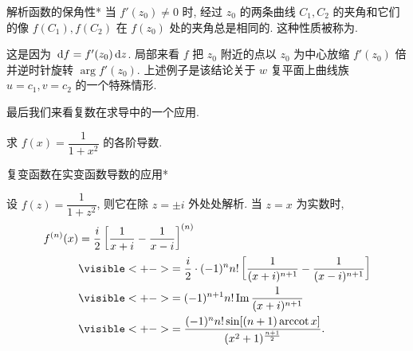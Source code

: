 \begin{frame}{解析函数的保角性*}
\onslide<+->
当 $f'(z_0)\neq 0$ 时, 
\onslide<+->
经过 $z_0$ 的两条曲线 $C_1,C_2$ 的夹角和它们的像 $f(C_1),f(C_2)$ 在 $f(z_0)$ 处的夹角总是相同的.
\onslide<+->
这种性质被称为.

\onslide<+->
这是因为 $\,\mathrm{d} f=f'(z_0)\,\mathrm{d} z$.
\onslide<+->
局部来看 $f$ 把 $z_0$ 附近的点以 $z_0$ 为中心放缩 $f'(z_0)$ 倍并逆时针旋转 $\arg{f'(z_0)}$.
\onslide<+->
上述例子是该结论关于 $w$ 复平面上曲线族 $u=c_1,v=c_2$ 的一个特殊情形.

\onslide<+->
最后我们来看复数在求导中的一个应用.
\begin{example}
求 $f(x)=\dfrac1{1+x^2}$ 的各阶导数.
\end{example}
\end{frame}


\begin{frame}{复变函数在实变函数导数的应用*}
\begin{solution}
设 $f(z)=\dfrac1{1+z^2}$, 则它在除 $z=\pm i$ 外处处解析.
\onslide<+->
当 $z=x$ 为实数时,
\onslide<+->
\begin{align*}
f^{(n)}(x)&=\frac i2\left[\frac1{x+i}-\frac1{x-i}\right]^{(n)}\\
&\visible<+->{=\frac i2\cdot(-1)^n n!\left[\frac1{(x+i)^{n+1}}-\frac1{(x-i)^{n+1}}\right]}\\
&\visible<+->{=(-1)^{n+1}n!\Im\frac1{(x+i)^{n+1}}}\\
&\visible<+->{=\frac{(-1)^nn!\sin[(n+1)\arccot x]}{(x^2+1)^{\frac{n+1}2}}.}
\end{align*}
\end{solution}
\end{frame}


